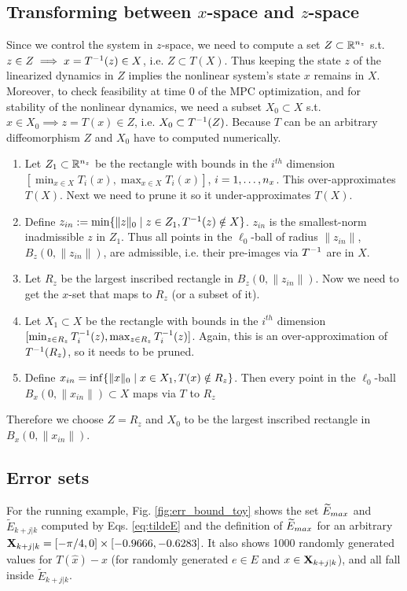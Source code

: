 \subsection{Transforming between $x$-space and $z$-space}
\label{sec:transforming x to z}
Since we control the system in $z$-space, we need to compute a set $Z \subset \mathbb{R}^{n_z}$ s.t. $z \in Z \implies x = T^{-1}(z) \in X$, i.e. $Z \subset T(X)$.
Thus keeping the state $z$ of the linearized dynamics in $Z$ implies the nonlinear system's state $x$ remains in $X$.
Moreover, to check feasibility at time 0 of the MPC optimization, and for stability of the nonlinear dynamics, we need a subset $X_0 \subset X$ s.t. $x \in X_0 \implies z = T(x) \in Z$, i.e. $X_0 \subset T^{-1}(Z)$.
Because $T$ can be an arbitrary diffeomorphism $Z$ and $X_0$ have to computed numerically.
\begin{enumerate}
	\item Let $Z_1 \subset \mathbb{R}^{n_z}$ be the rectangle with bounds in the $i^{th}$ dimension $[ \min_{x \in X} T_i(x),  \max_{x \in X} T_i(x) ]$, $i=1,\ldots, n_x$.
	This over-approximates $T(X)$. 
	Next we need to prune it so it under-approximates $T(X)$. 
	\item Define $z_{in} := \min \{ \|z \|_0 \;|\; z \in Z_1, T^{-1}(z) \notin X\}$.
	$z_{in}$ is the smallest-norm inadmissible $z$ in $Z_1$.
	Thus all points in the $\ell_0$-ball of radius $\|z_{in}\|$,$B_z(0,\|z_{in}\|)$, are admissible, i.e. their pre-images via $T^{-1}$ are in $X$.
	\item Let $R_z$ be the largest inscribed rectangle in $B_z(0,\|z_{in}\|)$.
	Now we need to get the $x$-set that maps to $R_z$  (or a subset of it).
	\item Let $X_1 \subset X$ be the rectangle with bounds in the $i^{th}$ dimension $[\min_{z \in R_{z}} T^{-1}_i(z),  \max_{z \in R_{z}} T^{-1}_i(z) ]$.
	Again, this is an over-approximation of $T^{-1}(R_{z})$, so it needs to be pruned.
	\item Define $x_{in} = \inf \{\|x\|_0 \;|\; x \in X_1, T(x) \notin R_{z}\}$.
	Then every point in the $\ell_0$-ball $B_x(0, \|x_{in}\|) \subset X$ maps via $T$ to $R_{z}$
\end{enumerate}
Therefore we choose $Z = R_z$ and $X_0$ to be the largest inscribed rectangle in $B_x(0,  \|x_{in}\|)$.

\subsection{Error sets}
For the running example, Fig. \ref{fig:err_bound_toy} shows the set $\widetilde{E}_{max}$ and $\tilde{E}_{k+j|k}$ computed by Eqs. \eqref{eq:tildeE} and the definition of $\widetilde{E}_{max}$ for an arbitrary  $\mathbf{X}_{k+j|k} =  [-\pi/4,0]\times[-0.9666,-0.6283]$. 
It also shows 1000 randomly generated values for $T(\hat{x})-x$ (for randomly generated $e \in E$ and $x \in \mathbf{X}_{k+j|k}$), and all fall inside $\tilde{E}_{k+j|k}$.

